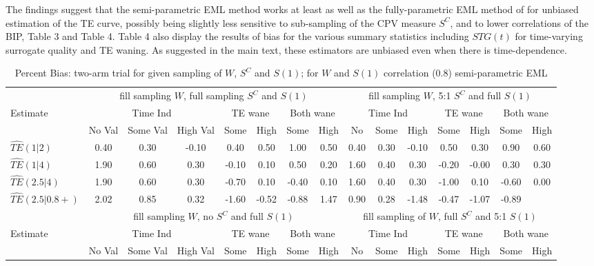 \documentclass[times, 11pt]{article}
\begin{document}
The findings suggest that the semi-parametric EML method works at least as well as the fully-parametric EML method of \citet{Gabriel13} for unbiased estimation of the TE curve, possibly being slightly less sensitive to sub-sampling of the CPV measure $S^{C}$, and to lower correlations of the BIP, Table 3 and Table 4. Table 4 also display the results of bias for the various summary statistics including $STG(t)$ for time-varying surrogate quality and TE waning. As suggested in the main text, these estimators are unbiased even when there is time-dependence.  

\begin{table} [H]
\caption{Percent Bias: two-arm trial for given sampling of $W$, $S^{C}$ and $S(1)$; for $W$ and $S(1)$ correlation (0.8) semi-parametric EML}
\begin{tabular}{l|ccc|cc|cc|ccc|cc|cc}
\hline
&\multicolumn{7}{c}{fill sampling $W$, full sampling $S^{C}$ and $S(1)$} &\multicolumn{7}{c}{fill sampling $W$, 5:1 $S^{C}$ and full $S(1)$}\\
Estimate&\multicolumn{3}{c}{Time Ind}&\multicolumn{2}{c}{TE wane}&\multicolumn{2}{c}{Both wane}&\multicolumn{3}{c}{Time Ind}&\multicolumn{2}{c}{TE wane}&\multicolumn{2}{c}{Both wane}\\
&No Val&Some Val&High Val&Some&High&Some&High&No&Some&High&Some&High&Some&High\\
\hline
$\widehat{TE}(1|2)$& 0.40 & 0.30 & -0.10 & 0.40 & 0.50 & 1.00 & 0.50 & 0.40 & 0.30 & -0.10 & 0.50 & 0.30 & 0.90 & 0.60 \\
$\widehat{TE}(1|4)$& 1.90 & 0.60 & 0.30 & -0.10 & 0.10 & 0.50 & 0.20 & 1.60 & 0.40 & 0.30 & -0.20 & -0.00 & 0.30 & 0.30 \\
$\widehat{TE}(2.5|4)$ & 1.90 & 0.60 & 0.30 & -0.70 & 0.10 & -0.40 & 0.10 & 1.60 & 0.40 & 0.30 & -1.00 & 0.10 & -0.60 & 0.00 \\
$\widehat{TE}(2.5|0.8+)$&2.02 & 0.85 & 0.32 & -1.60 & -0.52 & -0.88 & 1.47 & 0.90 & 0.28 & -1.48 & -0.47 & -1.07 & -0.89  \\
\hline
&\multicolumn{7}{c}{fill sampling $W$, no $S^{C}$ and full $S(1)$} &\multicolumn{7}{c}{fill sampling of $W$,  full $S^{C}$ and 5:1 $S(1)$}\\
Estimate&\multicolumn{3}{|c}{Time Ind}&\multicolumn{2}{|c}{TE wane}&\multicolumn{2}{|c}{Both wane}&\multicolumn{3}{|c}{Time Ind}&\multicolumn{2}{|c}{TE wane}&\multicolumn{2}{|c}{Both wane}\\
&No Val&Some Val&High Val&Some&High&Some&High&No&Some&High&Some&High&Some&High\\

\end{tabular}
\end{table}
\end{document}
